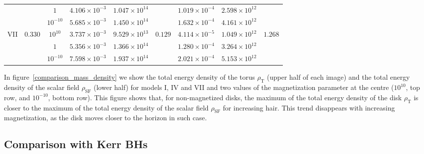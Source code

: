 \documentclass[twocolumn,aps,showpacs,showkeys,prd,superscriptaddress,byrevtex, amsmath]{revtex4-1}
\begin{document}
\begin{table}[t]
\begin{tabular}{c c c c c c c c c}
 & & $1$ & $4.106 \times 10^{-3}$ & $1.047 \times 10^{14}$ & & $1.019 \times 10^{-4}$ & $2.598 \times 10^{12}$ & \\ 

 & & $10^{-10}$ & $5.685 \times 10^{-3}$ & $1.450 \times 10^{14}$ & & $1.632 \times 10^{-4}$ & $4.161 \times 10^{12}$ & \\ 

VII & $0.330$ & $10^{10}$ & $3.737 \times 10^{-3}$ & $9.529 \times 10^{13}$ & $0.129$ & $4.114 \times 10^{-5}$ & $1.049 \times 10^{12}$ & $1.268$\\ 

 & & $1$ & $5.356 \times 10^{-3}$ & $1.366 \times 10^{14}$ & & $1.280 \times 10^{-4}$ & $3.264 \times 10^{12}$ & \\ 

 & & $10^{-10}$ & $7.598 \times 10^{-3}$ & $1.937 \times 10^{14}$ & & $2.021 \times 10^{-4}$ & $5.153 \times 10^{12}$ & \\ 
 \hline\hline   
\end{tabular}
\end{table}

In figure~\ref{comparison_mass_density} we show the total energy density of the torus $\rho_{\mathrm{T}}$ (upper half of each image) and the total energy density of the scalar field $\rho_{\mathrm{SF}}$ (lower half) for models I, IV and VII and two  values of the magnetization parameter at the centre ($10^{10}$, top row, and $10^{-10}$, bottom row). This figure shows that, for non-magnetized disks, the maximum of the total energy density of the disk $\rho_{\mathrm{T}}$ is closer to the maximum of the total energy density of the scalar field $\rho_{\mathrm{SF}}$ for increasing hair. This trend disappears with increasing magnetization, as the disk moves closer to the horizon in such case.

\subsection{Comparison with Kerr BHs}
\end{document}
